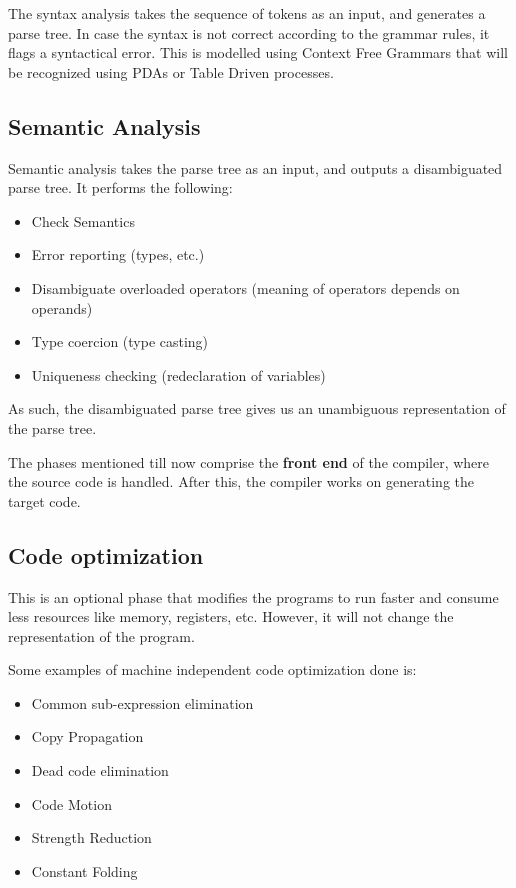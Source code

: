 \documentclass[12pt,letterpaper]{article}
\begin{document}
The syntax analysis takes the sequence of tokens as an input, and generates a parse tree. In case the syntax is not correct according to the grammar rules, it flags a syntactical error. This is modelled using Context Free Grammars that will be recognized using PDAs or Table Driven processes.

\subsection{Semantic Analysis}

Semantic analysis takes the parse tree as an input, and outputs a disambiguated parse tree. It performs the following:

\begin{itemize}
  \item Check Semantics
  \item Error reporting (types, etc.)
  \item Disambiguate overloaded operators (meaning of operators depends on operands)
  \item Type coercion (type casting)
  \item Uniqueness checking (redeclaration of variables)
\end{itemize}

As such, the disambiguated parse tree gives us an unambiguous representation of the parse tree.

The phases mentioned till now comprise the \textbf{front end} of the compiler, where the source code is handled. After this, the compiler works on generating the target code.

\subsection{Code optimization}

This is an optional phase that modifies the programs to run faster and consume less resources like memory, registers, etc. However, it will not change the representation of the program.

Some examples of machine independent code optimization done is:

\begin{itemize}
  \item Common sub-expression elimination
  \item Copy Propagation
  \item Dead code elimination
  \item Code Motion
  \item Strength Reduction
  \item Constant Folding
\end{itemize}
\end{document}
